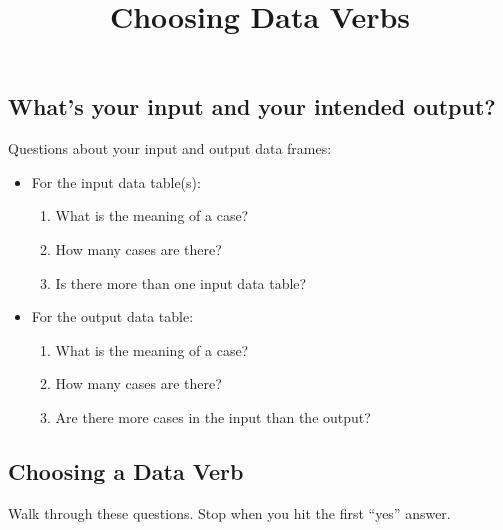 \documentclass[]{article}
\title{Choosing Data Verbs}
\author{}
\date{}
\begin{document}
\maketitle


\subsection{What's your input and your intended
output?}\label{whats-your-input-and-your-intended-output}

Questions about your input and output data frames:

\begin{itemize}
\itemsep1pt\parskip0pt
\item
  For the input data table(s):

  \begin{enumerate}
  \def\labelenumi{\arabic{enumi}.}
  \itemsep1pt\parskip0pt
  \item
    What is the meaning of a case?
  \item
    How many cases are there?
  \item
    Is there more than one input data table?
  \end{enumerate}
\item
  For the output data table:

  \begin{enumerate}
  \def\labelenumi{\arabic{enumi}.}
  \itemsep1pt\parskip0pt
  \item
    What is the meaning of a case?
  \item
    How many cases are there?
  \item
    Are there more cases in the input than the output?
  \end{enumerate}
\end{itemize}

\subsection{Choosing a Data Verb}\label{choosing-a-data-verb}

Walk through these questions. Stop when you hit the first ``yes''
answer.
\end{document}
